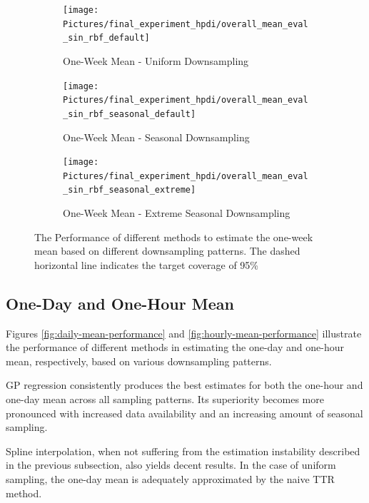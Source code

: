 \begin{figure}[!htb]
\centering
\begin{subfigure}{\textwidth}
    \centering
    \texttt{[image: Pictures/final\_experiment\_hpdi/overall\_mean\_eval\_sin\_rbf\_default]}
    \caption{One-Week Mean - Uniform Downsampling}
    \label{fig:weekly-mean-uniform-sampling-performance}
\end{subfigure}

\bigskip

\begin{subfigure}{\textwidth}
    \centering
    \texttt{[image: Pictures/final\_experiment\_hpdi/overall\_mean\_eval\_sin\_rbf\_seasonal\_default]}
    \caption{One-Week Mean - Seasonal Downsampling}
    \label{fig:weekly-mean-seasonal-sampling-performance}
\end{subfigure}

\bigskip

\begin{subfigure}{\textwidth}
    \centering
    \texttt{[image: Pictures/final\_experiment\_hpdi/overall\_mean\_eval\_sin\_rbf\_seasonal\_extreme]}
    \caption{One-Week Mean - Extreme Seasonal Downsampling}
    \label{fig:weekly-mean-extreme-seasonal-sampling-performance}
\end{subfigure}

\caption[One-Week Mean Performance]{The Performance of different methods to
estimate the one-week mean based on different downsampling patterns. The dashed horizontal line
indicates the target coverage of 95\% 
}
\label{fig:weekly-mean-performance}
\end{figure}



\subsection{One-Day and One-Hour Mean}

Figures \ref{fig:daily-mean-performance} and \ref{fig:hourly-mean-performance}
illustrate the performance of different methods in estimating the one-day and one-hour mean,
respectively, based on various downsampling patterns.

GP regression consistently produces the best estimates for both the one-hour and
one-day mean across all sampling patterns.
Its superiority becomes more pronounced with increased data availability and
an increasing amount of seasonal sampling.

Spline interpolation, when not suffering from the estimation instability
described in the previous subsection, also yields decent results.
In the case of uniform sampling, the one-day mean is adequately approximated
by the naive TTR method.

